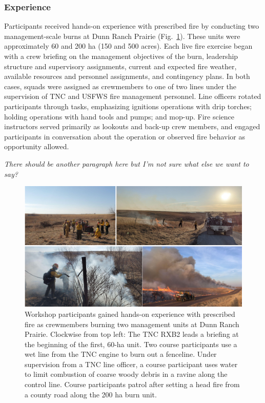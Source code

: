 \documentclass[fire,article,submit,moreauthors,pdftex]{Definitions/mdpi}
\begin{document}
\subsubsection{Experience}

Participants received hands-on experience with prescribed fire by conducting two management-scale burns at Dunn Ranch Prairie (Fig.~\ref{FireExperience}).
These units were approximately 60 and 200 ha (150 and 500 acres).
Each live fire exercise began with a crew briefing on the management objectives of the burn, leadership structure and supervisory assignments, current and expected fire weather, available resources and personnel assignments, and contingency plans.
In both cases, squads were assigned as crewmembers to one of two lines under the supervision of TNC and USFWS fire management personnel.
Line officers rotated participants through tasks, emphasizing ignitions operations with drip torches; holding operations with hand tools and pumps; and mop-up.
Fire science instructors served primarily as lookouts and back-up crew members, and engaged participants in conversation about the operation or observed fire behavior as opportunity allowed.

\emph{There should be another paragraph here but I'm not sure what else we want to say?}

\begin{figure}
\centering
\includegraphics[width=1\columnwidth]{FireExperience.pdf}
\caption{Workshop participants gained hands-on experience with prescribed fire as crewmembers burning two management units at Dunn Ranch Prairie. Clockwise from top left: The TNC RXB2 leads a briefing at the beginning of the first, 60-ha unit. Two course participants use a wet line from the TNC engine to burn out a fenceline. Under supervision from a TNC line officer, a course participant uses water to limit combustion of coarse woody debris in a ravine along the control line. Course participants patrol after setting a head fire from a county road along the 200 ha burn unit.}
\label{FireExperience}
\end{figure}
\end{document}
